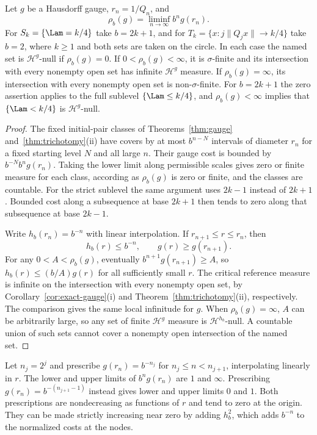 \begin{corollary}\label{cor:liminf-gauges}
Let $g$ be a Hausdorff gauge, $r_n=1/Q_n$, and
\[
\rho_b(g)=\liminf_{n\to\infty} b^n g(r_n).
\]
For $S_k=\{\Lam=k/4\}$ take $b=2k+1$, and for
$T_k=\{x:j\|Q_jx\|\to k/4\}$ take $b=2$, where $k\ge1$ and both sets
are taken on the circle. In each case the named set is
$\mathcal H^g$-null if $\rho_b(g)=0$. If $0<\rho_b(g)<\infty$, it is
$\sigma$-finite and its intersection with every nonempty open set has
infinite $\mathcal H^g$ measure. If $\rho_b(g)=\infty$, its intersection
with every nonempty open set is non-$\sigma$-finite. For $b=2k+1$ the
zero assertion applies to the full sublevel $\{\Lam\le k/4\}$, and
$\rho_b(g)<\infty$ implies that $\{\Lam<k/4\}$ is $\mathcal H^g$-null.
\end{corollary}

\begin{proof}
The fixed initial-pair classes of Theorems~\ref{thm:gauge}
and~\ref{thm:trichotomy}(ii) have covers by at most $b^{n-N}$ intervals
of diameter $r_n$ for a fixed starting level $N$ and all large $n$.
Their gauge cost is bounded by $b^{-N}b^n g(r_n)$. Taking the lower
limit along permissible scales gives zero or finite measure for each
class, according as $\rho_b(g)$ is zero or finite, and the classes are
countable. For the strict sublevel the same argument uses $2k-1$
instead of $2k+1$. Bounded cost along a subsequence at base $2k+1$
then tends to zero along that subsequence at base $2k-1$.

Write $h_b(r_n)=b^{-n}$ with linear interpolation. If
$r_{n+1}\le r\le r_n$, then
\[
 h_b(r)\le b^{-n},\qquad g(r)\ge g(r_{n+1}).
\]
For any $0<A<\rho_b(g)$, eventually $b^{n+1}g(r_{n+1})\ge A$,
so $h_b(r)\le(b/A)g(r)$ for all sufficiently small $r$. The critical
reference measure is infinite on the intersection with every nonempty
open set, by Corollary~\ref{cor:exact-gauge}(i) and
Theorem~\ref{thm:trichotomy}(ii), respectively. The comparison gives the
same local infinitude for $g$. When $\rho_b(g)=\infty$, $A$ can be
arbitrarily large, so any set of finite $\mathcal H^g$ measure is
$\mathcal H^{h_b}$-null. A countable union of such sets cannot cover
a nonempty open intersection of the named set.
\end{proof}

\begin{remark}
Let $n_j=2^j$ and prescribe $g(r_n)=b^{-n_j}$ for
$n_j\le n<n_{j+1}$, interpolating linearly in $r$. The lower and upper
limits of $b^ng(r_n)$ are $1$ and $\infty$. Prescribing
$g(r_n)=b^{-(n_{j+1}-1)}$ instead gives lower and upper limits $0$ and $1$.
Both prescriptions are nondecreasing as functions of $r$ and tend to zero
at the origin. They can be made strictly increasing near zero by adding
$h_b^2$, which adds $b^{-n}$ to the normalized costs at the nodes.
\end{remark}

